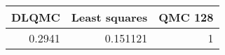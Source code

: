\begin{tabular}{rrr}
\toprule
   DLQMC &   Least squares &   QMC 128 \\
\midrule
  0.2941 &        0.151121 &         1 \\
\bottomrule
\end{tabular}
